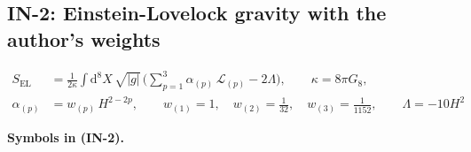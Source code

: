 \documentclass[
  10pt,
]{article}
\begin{document}
\hypertarget{in-2-einstein-lovelock-gravity-with-the-authors-weights}{%
\subsection{IN-2: Einstein-Lovelock gravity with the author's
weights}\label{in-2-einstein-lovelock-gravity-with-the-authors-weights}}

\[
\begin{aligned}
S_{\mathrm{EL}} &= \frac{1}{2\kappa}\int\mathrm{d}^8X\,\sqrt{\lvert g\rvert}\,
 \Big(\sum_{p=1}^{3}\alpha_{(p)}\,\mathcal{L}_{(p)} - 2\Lambda\Big),\qquad \kappa = 8\pi G_8,\\
\alpha_{(p)} &= w_{(p)}\,H^{2-2p},\qquad w_{(1)} = 1,\quad w_{(2)} = \frac{1}{32},\quad w_{(3)} =
 \frac{1}{1152},
 \qquad \Lambda = -10H^2
\end{aligned} \tag{IN-2}
\]

\textbf{Symbols in (IN-2).}
\end{document}
